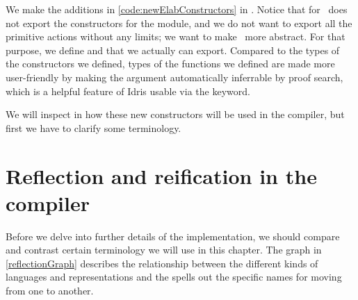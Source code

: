 We make the additions in \autoref{code:newElabConstructors} in \LRE.  Notice
that  for \Elab\ does not export the constructors for the module,
and we do not want to export all the primitive actions without any limits; we
want to make \Elab\ more abstract. For that purpose, we define
 and  that we actually can export.
Compared to the types of the constructors we defined, types of the functions we
defined are made more user-friendly by making the  argument
automatically inferrable by proof search, which is a helpful feature of Idris
usable via the  keyword.

We will inspect in \label{sec:primitiveEditorableImpl} how these new
constructors will be used in the compiler, but first we have to clarify some
terminology.

\section{Reflection and reification in the compiler}

Before we delve into further details of the implementation, we should compare
and contrast certain terminology we will use in this chapter. The graph in
\autoref{reflectionGraph} describes the relationship between the different
kinds of languages and representations and the spells out the specific names
for moving from one to another.

